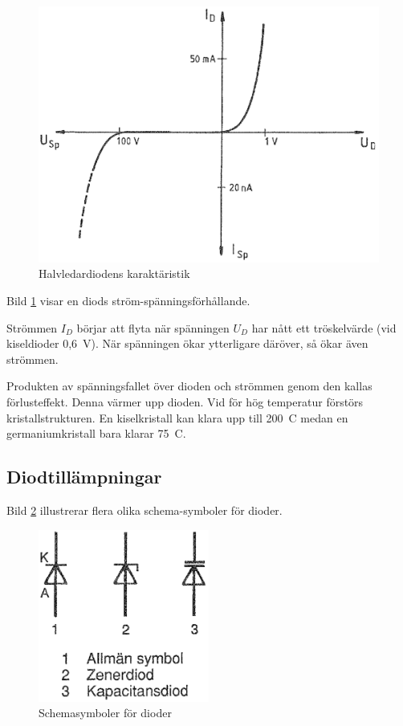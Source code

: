 \begin{figure}
\includegraphics[width=\textwidth]{images/cropped_pdfs/bild_2_2-13.pdf}
\caption{Halvledardiodens karaktäristik}
\label{fig:BildII2-13}
\end{figure}

Bild \ref{fig:BildII2-13} visar en diods ström-spänningsförhållande.

Strömmen \(I_D\) börjar att flyta när spänningen \(U_D\) har nått ett
tröskelvärde (vid kiseldioder 0,6~V).
När spänningen ökar ytterligare däröver, så ökar även strömmen.

Produkten av spänningsfallet över dioden och strömmen genom den kallas
förlusteffekt. Denna värmer upp dioden. Vid för hög temperatur förstörs
kristallstrukturen. En kiselkristall kan klara upp till 200~\degree C medan en
germaniumkristall bara klarar 75~\degree C.

\subsection{Diodtillämpningar}

Bild \ref{fig:BildII2-14} illustrerar flera olika schema-symboler för
dioder.

\begin{figure}
\includegraphics[width=0.5\textwidth]{images/cropped_pdfs/bild_2_2-14.pdf}
\caption{Schemasymboler för dioder}
\label{fig:BildII2-14}
\end{figure}

